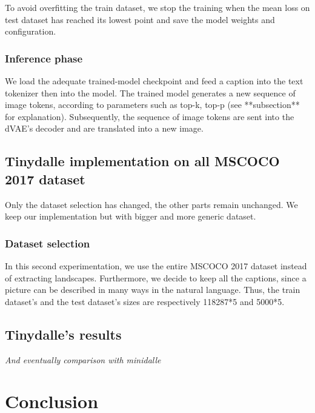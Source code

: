\documentclass{article}
\begin{document}
To avoid overfitting the train dataset, we stop the training when the mean loss on test dataset has reached its lowest point and save the model weights and configuration.

\subsubsection{Inference phase}

We load the adequate trained-model checkpoint and feed a caption into the text tokenizer then into the model. The trained model generates a new sequence of image tokens, according to parameters such as top-k, top-p (see **subsection** for explanation). Subsequently, the sequence of image tokens are sent into the dVAE's decoder and are translated into a new image.

\subsection{Tinydalle implementation on all MSCOCO 2017 dataset}

Only the dataset selection has changed, the other parts remain unchanged. We keep our implementation but with bigger and more generic dataset.

\subsubsection{Dataset selection}

In this second experimentation, we use the entire MSCOCO 2017 dataset instead of extracting landscapes. Furthermore, we decide to keep all the captions, since a picture can be described in many ways in the natural language. Thus, the train dataset's and the test dataset's sizes are respectively 118287*5 and 5000*5.



\subsection{Tinydalle's results}\label{subsec:tinydalle_results}

\textit{And eventually comparison with minidalle}

\pagebreak

\section{Conclusion}

\pagebreak
{}
{}
\end{document}
